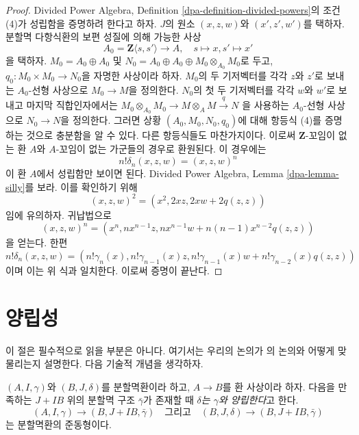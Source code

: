 \begin{proof}
Divided Power Algebra, Definition \ref{dpa-definition-divided-powers}의
조건 (4)가 성립함을 증명하려 한다고 하자. $J$의 원소
$(x, z, w)$와 $(x', z', w')$를 택하자. 분할멱 다항식환의
보편 성질에 의해 가능한 사상
$$
A_0 = \mathbf{Z}\langle s, s'\rangle \longrightarrow A,\quad
s \longmapsto x,
s' \longmapsto x'
$$
을 택하자. $M_0 = A_0 \oplus A_0$ 및
$N_0 = A_0 \oplus A_0 \oplus M_0 \otimes_{A_0} M_0$로 두고,
$q_0 : M_0 \times M_0 \to N_0$을 자명한 사상이라 하자.
$M_0$의 두 기저벡터를 각각 $z$와 $z'$로 보내는
$A_0$-선형 사상으로 $M_0 \to M$을 정의한다.
$N_0$의 첫 두 기저벡터를 각각 $w$와 $w'$로 보내고 마지막
직합인자에서는
$M_0 \otimes_{A_0} M_0 \to M \otimes_A M \xrightarrow{q} N$
을 사용하는 $A_0$-선형 사상으로 $N_0 \to N$을 정의한다.
그러면 상황 $(A_0, M_0, N_0, q_0)$에 대해 항등식 (4)를
증명하는 것으로 충분함을 알 수 있다. 다른 항등식들도 마찬가지이다.
이로써 $\mathbf{Z}$-꼬임이 없는 환 $A$와 $A$-꼬임이 없는
가군들의 경우로 환원된다. 이 경우에는
$$
n! \delta_n(x, z, w) = (x, z, w)^n
$$
이 환 $A$에서 성립함만 보이면 된다. Divided Power Algebra,
Lemma \ref{dpa-lemma-silly}를 보라. 이를 확인하기 위해
$$
(x, z, w)^2 = (x^2, 2xz, 2xw + 2q(z, z))
$$
임에 유의하자. 귀납법으로
$$
(x, z, w)^n = (x^n, nx^{n - 1}z, nx^{n - 1}w + n(n - 1)x^{n - 2}q(z, z))
$$
을 얻는다. 한편
$$
n! \delta_n(x, z, w) = (n!\gamma_n(x), n!\gamma_{n - 1}(x)z,
n!\gamma_{n - 1}(x)w + n!\gamma_{n - 2}(x) q(z, z))
$$
이며 이는 위 식과 일치한다. 이로써 증명이 끝난다.
\end{proof}




\section{양립성}
\label{section-compatibility}

\noindent
이 절은 필수적으로 읽을 부분은 아니다. 여기서는 우리의 논의가
\cite{Berthelot}의 논의와 어떻게 맞물리는지 설명한다.
다음 기술적 개념을 생각하자.

\begin{definition}
\label{definition-compatible}
$(A, I, \gamma)$와 $(B, J, \delta)$를 분할멱환이라 하고,
$A \to B$를 환 사상이라 하자. 다음을 만족하는 $J + IB$ 위의
분할멱 구조 $\bar\gamma$가 존재할 때
{\it $\delta$는 $\gamma$와 양립한다}고 한다.
$$
(A, I, \gamma) \to (B, J + IB, \bar \gamma)\quad\text{그리고}\quad
(B, J, \delta) \to (B, J + IB, \bar \gamma)
$$
는 분할멱환의 준동형이다.
\end{definition}

